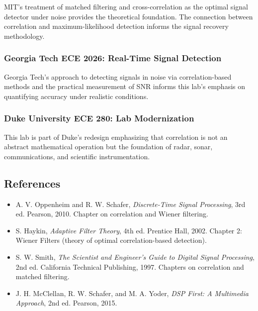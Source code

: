 \documentclass[11pt,letterpaper]{article}
\begin{document}
MIT's treatment of matched filtering and cross-correlation as the optimal signal detector under noise provides the theoretical foundation. The connection between correlation and maximum-likelihood detection informs the signal recovery methodology.

\subsubsection*{Georgia Tech ECE 2026: Real-Time Signal Detection}

Georgia Tech's approach to detecting signals in noise via correlation-based methods and the practical measurement of SNR informs this lab's emphasis on quantifying accuracy under realistic conditions.

\subsubsection*{Duke University ECE 280: Lab Modernization}

This lab is part of Duke's redesign emphasizing that correlation is not an abstract mathematical operation but the foundation of radar, sonar, communications, and scientific instrumentation.

\subsection*{References}

\begin{itemize}
    \item A. V. Oppenheim and R. W. Schafer, \textit{Discrete-Time Signal Processing}, 3rd ed. Pearson, 2010. Chapter on correlation and Wiener filtering.
    \item S. Haykin, \textit{Adaptive Filter Theory}, 4th ed. Prentice Hall, 2002. Chapter 2: Wiener Filters (theory of optimal correlation-based detection).
    \item S. W. Smith, \textit{The Scientist and Engineer's Guide to Digital Signal Processing}, 2nd ed. California Technical Publishing, 1997. Chapters on correlation and matched filtering.
    \item J. H. McClellan, R. W. Schafer, and M. A. Yoder, \textit{DSP First: A Multimedia Approach}, 2nd ed. Pearson, 2015.
\end{itemize}
\end{document}
